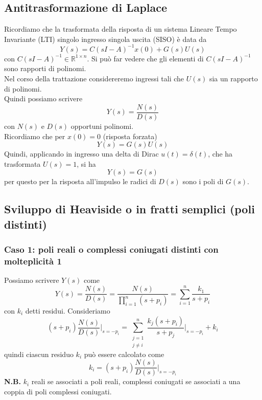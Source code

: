 \documentclass{article}
\numberwithin{equation}{subsection}
\let\oldsubsection\subsection%
\renewcommand{\subsection}{%
  \renewcommand{\theequation}{\thesubsection.\arabic{equation}}%
  \oldsubsection}%
\begin{document}
\subsection{Antitrasformazione di Laplace}
Ricordiamo che la trasformata della risposta di un sistema Lineare Tempo Invariante (LTI) singolo ingresso singola uscita (SISO) è data da
\[
    Y(s) = C(sI-A)^{-1} x(0) + G(s)U(s)
\]
con $C(sI-A)^{-1} \in \mathbb{R}^{1 \times n}$. Si può far vedere che gli elementi di $C(sI-A)^{-1}$ sono rapporti di polinomi.\\
Nel corso della trattazione considereremo ingressi tali che $U (s)$ sia un rapporto di polinomi.
\vspace*{0.2cm}\\
Quindi possiamo scrivere 
\begin{equation}
    Y(s) = \frac{N(s)}{D(s)}
\end{equation}
con $N (s)$ e $D(s)$ opportuni polinomi.
\vspace*{0.2cm}\\
Ricordiamo che per $x(0)=0$ (risposta forzata)
\[
    Y(s)=G(s)U(s)
\]  
Quindi, applicando in ingresso una delta di Dirac $u(t)=\delta(t)$, che ha trasformata $U(s)=1$, si ha
\[
    Y(s) = G(s)  
\]
per questo per la risposta all'impulso le radici di $D(s)$ sono i poli di $G(s)$.


\subsection{Sviluppo di Heaviside o in fratti semplici (poli distinti)}
\subsubsection{Caso 1: poli reali o complessi coniugati distinti con molteplicità 1}
Possiamo scrivere $Y(s)$ come 
\begin{equation*}
    Y(s) = \frac{N(s)}{D(s)} = \frac{N(s)}{\prod_{i=1}^n (s + p_i)} = \sum_{i=1}^n \frac{k_1}{s+p_i}
\end{equation*}
con $k_i$ detti residui. Consideriamo
\begin{equation*}
    (s+p_i) \frac{N(s)}{D(s)} \bigg|_{s = -p_i} = \sum_{\substack{j=1 \\ j\neq i}}^n \frac{k_j(s+p_i)}{s+p_j} \bigg|_{s=-p_i} + k_i
\end{equation*}
quindi ciascun residuo $k_i$ può essere calcolato come
\begin{equation}
    k_i = (s+p_i) \frac{N(s)}{D(s)} \bigg|_{s=-p_i}
\end{equation}
\textbf{N.B.} $k_i$ reali se associati a poli reali, complessi coniugati se associati a una coppia di poli complessi coniugati.
\end{document}
